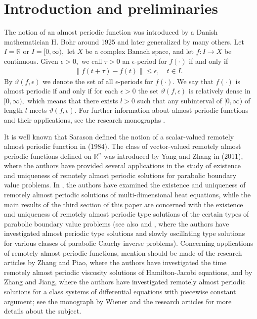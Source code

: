 \documentclass[english,reqno]{amsart}
\numberwithin{equation}{section}
\theoremstyle{plain}
\theoremstyle{definition}
\theoremstyle{remark}
\begin{document}
%
\section{Introduction and preliminaries}

The notion of an almost periodic function was introduced by a Danish mathematician H. Bohr around 1925 and later generalized by many others. 
Let $I={\mathbb R}$ or $I=[0,\infty),$ let $X$ be a complex Banach space, and let $f : I \rightarrow X$ be continuous. Given $\epsilon>0,$ we call $\tau>0$ an $\epsilon$-period for $f(\cdot)$  if and only if
\begin{align*}
\| f(t+\tau)-f(t) \| \leq \epsilon,\quad t\in I.
\end{align*}
By $\vartheta(f,\epsilon)$ we denote the set of all $\epsilon$-periods for $f(\cdot).$ We say that $f(\cdot)$ is almost periodic if and only if for each $\epsilon>0$ the set $\vartheta(f,\epsilon)$ is relatively dense in $[0,\infty),$ which means that
there exists $l>0$ such that any subinterval of $[0,\infty)$ of length $l$ meets $\vartheta(f,\epsilon)$. For further information about almost periodic functions and their applications, see the research monographs \cite{diagana, fink, gaston, cheban, 10r,CMPS2, nova-mono,188, 30,zhang-mono}. 

It is well known that Sarason defined the notion of a scalar-valued remotely almost periodic function in \cite{sarason} (1984). The class of vector-valued remotely almost periodic functions defined on ${\mathbb R}^{n}$ was introduced by Yang and Zhang in \cite{fyang1} (2011), where the authors have provided several applications in the study of existence and uniqueness of
remotely almost periodic solutions for parabolic
boundary value problems. 
In \cite[Proposition 2.4-Proposition 2.6]{fyang1}, the authors have examined the existence and uniqueness of remotely almost periodic solutions of multi-dimensional heat equations, while the main results of the third section of this paper are concerned with the existence and uniqueness of remotely almost periodic type solutions of the certain types of parabolic
boundary value problems (see also \cite{fyang} and \cite{fyang2}, where the authors have investigated almost periodic type solutions and slowly oscillating type solutions for various classes of
parabolic Cauchy inverse problems). 
Concerning applications of remotely almost periodic functions, mention should be made of the research articles \cite{szhang} by Zhang and Piao, where the authors have investigated the time remotely almost periodic viscosity solutions
of Hamilton-Jacobi equations, and \cite{zhangremote1} by Zhang and Jiang, where the authors have investigated remotely almost periodic solutions for a class systems of differential
equations with piecewise constant argument; see the monograph by Wiener \cite{wiener} and the research articles \cite{kapital2, kapital3, CMPS1,mkdv0,P_DEPCAG,TPCK1,VP,kapital6} for more details about the subject.
\end{document}
